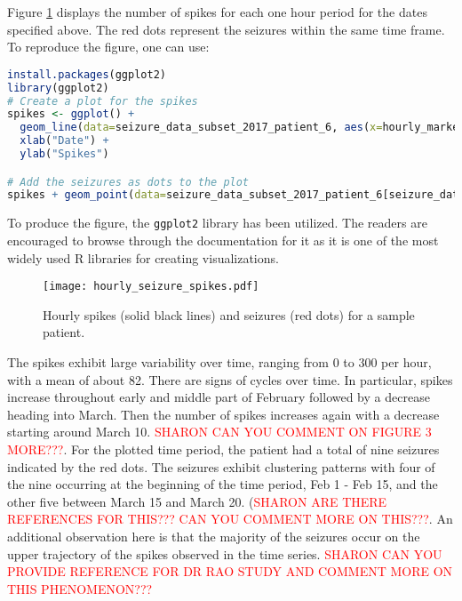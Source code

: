 Figure \ref{fig:time_seizure_spikes} displays the number of spikes for each one hour period for the dates specified above. The red dots represent the seizures within the same time frame. To reproduce the figure, one can use:
\begin{lstlisting}[language=R]
install.packages(ggplot2)
library(ggplot2)
# Create a plot for the spikes
spikes <- ggplot() +
  geom_line(data=seizure_data_subset_2017_patient_6, aes(x=hourly_markers, y=iea_lead_agg)) +
  xlab("Date") +
  ylab("Spikes")

# Add the seizures as dots to the plot
spikes + geom_point(data=seizure_data_subset_2017_patient_6[seizure_data_subset_2017_patient_6$le > 0, ], aes(x=hourly_markers, y=iea_lead_agg), color='red')
\end{lstlisting}
To produce the figure, the \verb|ggplot2| library has been utilized. The readers are encouraged to browse through the documentation for it as it is one of the most widely used R libraries for creating visualizations.
\begin{figure}[H]
  \centering
  \texttt{[image: hourly\_seizure\_spikes.pdf]}
  \caption{Hourly spikes (solid black lines) and seizures (red dots) for a sample patient.}
  \label{fig:time_seizure_spikes}
\end{figure}
The spikes exhibit large variability over time, ranging from 0 to 300 per hour, with a mean of about 82. There are signs of cycles over time. In particular, spikes increase throughout early and middle part of February followed by a decrease heading into March. Then the number of spikes increases again with a decrease starting around March 10. \textcolor{red}{SHARON CAN YOU COMMENT ON FIGURE 3 MORE???}. For the plotted time period, the patient had a total of nine seizures indicated by the red dots. The seizures exhibit clustering patterns with four of the nine occurring at the beginning of the time period, Feb 1 - Feb 15, and the other five between March 15 and March 20. (\textcolor{red}{SHARON ARE THERE REFERENCES FOR THIS??? CAN YOU COMMENT MORE ON THIS???}. An additional observation here is that the majority of the seizures occur on the upper trajectory of the spikes observed in the time series. \textcolor{red}{SHARON CAN YOU PROVIDE REFERENCE FOR DR RAO STUDY AND COMMENT MORE ON THIS PHENOMENON???}
